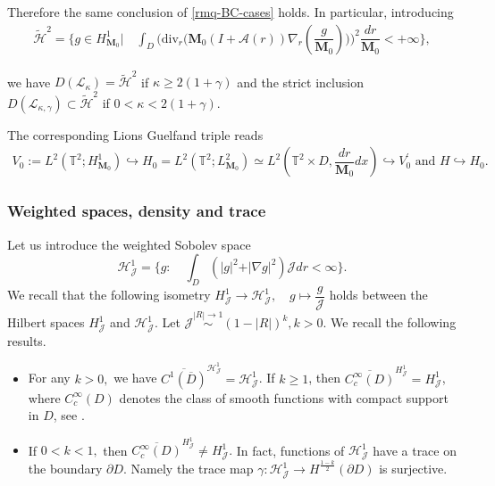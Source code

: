 \documentclass[a4paper,12pt, reqno]{amsart}
\newcommand{\Div}{\text{div}}
\begin{document}
Therefore the same conclusion of \autoref{rmq-BC-cases} holds. In particular,  introducing 
\begin{align*}
   \widetilde{\mathcal{H}}^2=\{ g\in  H^1_{\mathbf{M}_0} | \quad \int_D \big(\Div_r\bigl(\mathbf{M}_0 (I+\mathcal{A}(r))\nabla_r(\dfrac{g}{\mathbf{M}_0})\bigr))^2\dfrac{dr}{\mathbf{M}_0}<+\infty\},
\end{align*}

we have $D(\mathcal{L}_\kappa)=   \widetilde{\mathcal{H}}^2$ if $ \kappa\geq 2(1+\gamma)$ and  the strict inclusion $D(\mathcal{L}_{\kappa,\gamma})\subset    \widetilde{\mathcal{H}}^2$ if $ 0<\kappa< 2(1+\gamma)$.


The corresponding Lions Guelfand triple reads
\begin{align}\label{spaces-2}    
V_0:= L^2(\mathbb{T}^2;H^1_{\mathbf{M}_0})\hookrightarrow H_0=L^2(\mathbb{T}^2;L^2_{\mathbf{M}_0})\simeq  L^2(\mathbb{T}^2\times D, \dfrac{dr}{\mathbf{M}_0}dx) \hookrightarrow  V_0^\prime \text{ and } H\hookrightarrow  H_0.
\end{align}
\subsubsection{Weighted spaces, density and  trace}
Let us introduce the weighted Sobolev space $$\mathcal{H}^1_{\mathcal{J}}=\{g: \quad \int_D(\vert g\vert^2+\vert \nabla g\vert^2)\mathcal{J} dr<\infty\}.$$ We recall that  the following isometry $H^1_\mathcal{J} \to  \mathcal{H}^1_\mathcal{J}, \quad g\mapsto \dfrac{g}{\mathcal{J}}$ holds between the Hilbert spaces $H^1_\mathcal{J}$ and  $\mathcal{H}^1_\mathcal{J}.$
Let $\mathcal{J} \overset{|R| \to 1}{\sim} (1-|R|)^k, k>0$. We recall the following results.
\begin{itemize}
    \item  For any $k>0,$ we have $    \overline{C^1(\overline{D})}^{\mathcal{H}^1_\mathcal{J}}=\mathcal{H}^1_{\mathcal{J}}$. If $k\geq 1$, then     $\overline{C^\infty_c(D)}^{H^1_\mathcal{J}}=H^1_{\mathcal{J}}$, where $C^\infty_c(D)$ denotes the class of smooth functions with compact support in $D$,  see \cite[Prop. B.2]{Masmoudi2013}.
    \item If  $0<k<1,$ then  $\overline{C^\infty_c(D)}^{H^1_\mathcal{J}}\neq H^1_{\mathcal{J}}.$ In fact, functions of $\mathcal{H}^1_\mathcal{J}$ have a trace on the boundary $\partial D$. Namely the trace map $\gamma:\mathcal{H}^1_\mathcal{J} \to H^{\frac{1-k}{2}}(\partial D) $ is surjective.
\end{itemize}
\end{document}
